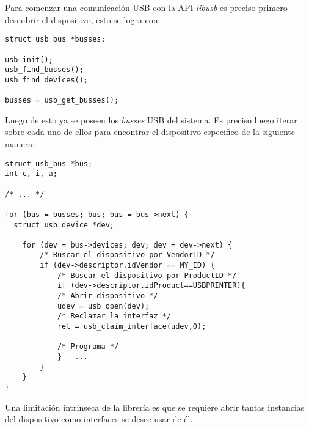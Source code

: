 
Para comenzar una comunicaci\'on USB con la API \emph{libusb} es preciso
primero descubrir el dispositivo, esto se logra con:

\begin{lstlisting}
struct usb_bus *busses;
    
usb_init();
usb_find_busses();
usb_find_devices();
    
busses = usb_get_busses();
\end{lstlisting}

Luego de esto ya se poseen los \emph{busses} USB del sistema. Es preciso luego
iterar sobre cada uno de ellos para encontrar el dispositivo especifico de la
siguiente manera:

\begin{lstlisting}
struct usb_bus *bus;
int c, i, a;
    
/* ... */
    
for (bus = busses; bus; bus = bus->next) {
  struct usb_device *dev;
    
    for (dev = bus->devices; dev; dev = dev->next) {
        /* Buscar el dispositivo por VendorID */
        if (dev->descriptor.idVendor == MY_ID) {
            /* Buscar el dispositivo por ProductID */
            if (dev->descriptor.idProduct==USBPRINTER){
            /* Abrir dispositivo */
            udev = usb_open(dev);
            /* Reclamar la interfaz */
            ret = usb_claim_interface(udev,0); 

            /* Programa */
            }	...
        }
    }
}
\end{lstlisting}

Una limitaci\'on intr\'inseca de la librer\'ia es que se requiere abrir tantas
instancias del dispositivo como interfaces se desee usar de \'el.\\

